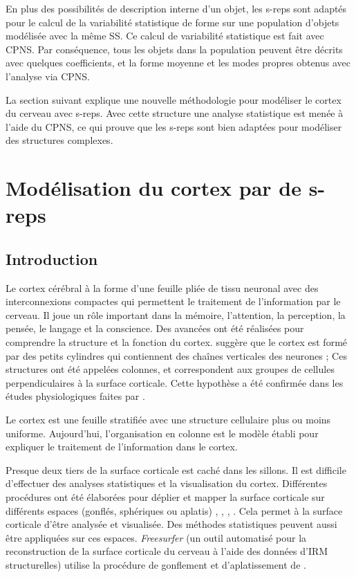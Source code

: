 En plus des possibilités de description interne d'un objet, les s-reps sont adaptés pour le calcul de la variabilité statistique de forme sur une population d'objets modélisée avec la même SS.
Ce calcul de variabilité statistique est fait avec CPNS.
Par conséquence, tous les objets dans la population peuvent être décrits avec quelques coefficients, et la forme moyenne et les modes propres obtenus avec l'analyse via CPNS.

La section suivant explique une nouvelle méthodologie pour modéliser le cortex du cerveau avec s-reps.
Avec cette structure une analyse statistique est menée à l'aide du CPNS, ce qui prouve que les s-reps sont bien adaptées pour modéliser des structures complexes.

\section{Modélisation du cortex par de s-reps}
\label{sec:cortexModelingfr}
\subsection{Introduction}
\label{sec:introductionfr}

Le cortex cérébral à la forme d'une feuille pliée de tissu neuronal avec 
des interconnexions compactes qui permettent le traitement de l'information par le cerveau.
Il joue un rôle important dans la mémoire, l'attention, la perception, la pensée, le langage et la conscience.
Des avancées ont été réalisées pour comprendre la structure et la fonction du cortex.
\cite{lorente1934studies} suggère que le cortex est formé par des petits cylindres qui contiennent des chaînes verticales des neurones ;
Ces structures ont été appelées colonnes, et correspondent aux groupes de cellules perpendiculaires à la surface corticale.
Cette hypothèse a été confirmée dans les études physiologiques faites par \cite{mountcastle1998perceptual}.

Le cortex est une feuille stratifiée avec une structure cellulaire plus ou moins uniforme.
Aujourd'hui, l'organisation en colonne est le modèle établi pour expliquer le traitement de l'information dans le cortex.

Presque deux tiers de la surface corticale est caché dans les sillons. Il est difficile 
d'effectuer des analyses statistiques et la visualisation du cortex.
Différentes procédures ont été élaborées pour déplier et mapper la surface corticale sur différents espaces (gonflés, sphériques ou aplatis)
\cite{drury_computerized_1996}, \cite{hermosillo_unfolding_1999}, \cite{fischl_cortical_1999}, \cite{pons_area_2004}.
Cela permet à la surface corticale d'être analysée et visualisée. 
Des méthodes statistiques peuvent aussi être appliquées sur ces espaces.
\textit{Freesurfer} 
(un outil automatisé pour la reconstruction de la surface corticale du cerveau à l'aide des données d'IRM structurelles) 
utilise la procédure de gonflement et d'aplatissement de \cite{fischl_cortical_1999}.

